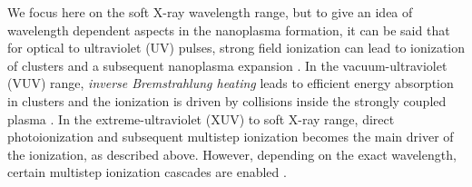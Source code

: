 We focus here on the soft X-ray wavelength range, but to give an idea of wavelength dependent aspects in the nanoplasma formation, it can be said that for optical to ultraviolet (UV) pulses, strong field ionization can lead to ionization of clusters and a subsequent nanoplasma expansion \citep{Springate-2000-PRA}. In the vacuum-ultraviolet (VUV) range, \textit{inverse Bremstrahlung heating} leads to efficient energy absorption in clusters and the ionization is driven by collisions inside the strongly coupled plasma \citep{Wabnitz-2002-Nature}. In the extreme-ultraviolet (XUV) to soft X-ray range, direct photoionization and subsequent multistep ionization becomes the main driver of the ionization, as described above. However, depending on the exact wavelength, certain multistep ionization cascades are enabled \citep{Arbeiter-2011-NJP}.\\[1\baselineskip]
%
%
%
